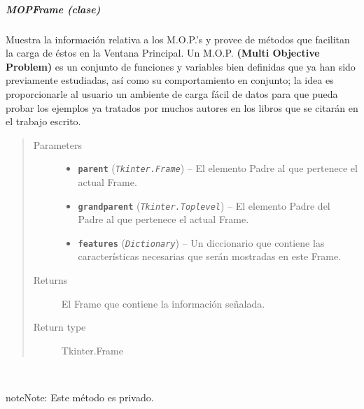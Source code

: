 \documentclass[class=report, crop=false]{standalone}
\begin{document}
\subparagraph{MOPFrame (clase)}
\label{sec:a_3_3_2_3_1_1}
\begin{fulllineitems}

\begin{DUlineblock}{0em}
\item[] Muestra la información relativa a los M.O.P.'s y
provee de métodos que facilitan la carga de éstos en la
Ventana Principal.\break
Un M.O.P. \textbf{(Multi Objective Problem)} es un conjunto 
de funciones y variables bien definidas que ya han sido previamente 
estudiadas, así como su comportamiento en conjunto; la idea es 
proporcionarle al usuario un ambiente de carga fácil de datos 
para que pueda probar los ejemplos ya tratados por muchos 
autores en los libros que se citarán en el trabajo escrito.
\end{DUlineblock}

\begin{quote}\begin{description}
\item[{Parameters}] \leavevmode\begin{itemize}
\item \textbf{\texttt{parent}} (\emph{\texttt{Tkinter.Frame}}) -- El elemento Padre al que pertenece el actual Frame.
\item \textbf{\texttt{grandparent}} (\emph{\texttt{Tkinter.Toplevel}}) -- El elemento Padre del Padre al que pertenece el actual Frame.
\item \textbf{\texttt{features}} (\emph{\texttt{Dictionary}}) -- Un diccionario que contiene las características necesarias que serán mostradas en este Frame.
\end{itemize}

\item[{Returns}] \leavevmode
El Frame que contiene la información señalada.
\item[{Return type}] \leavevmode
Tkinter.Frame
\end{description}\end{quote}


\begin{fulllineitems}

~

\begin{notice}{note}{Note:}
Este método es privado.
\end{notice}


\end{fulllineitems}
\end{fulllineitems}
\end{document}

